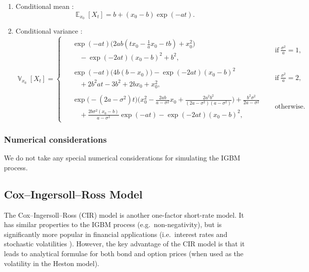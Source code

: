 \documentclass[11pt, letterpaper]{article}
\theoremstyle{definition}
\theoremstyle{remark}
\DeclareMathOperator{\E}{\mathbb{E}}
\DeclareMathOperator{\V}{\mathbb{V}}
\begin{document}
\begin{appendices}
\begin{enumerate}
    \item Conditional mean \cite{tubikanec2022igbm}: \begin{equation}
        \E_{x_0}[X_t] = b + (x_0 - b)\exp(-a t).
    \end{equation}
    \item Conditional variance \cite{tubikanec2022igbm}: \begin{equation}
    \V_{x_0}[X_t] = \begin{cases}
        \begin{aligned}
        &\exp(-at)\bigl( 2 ab (t x_0 -\tfrac{1}{a} x_0 -t b)+x_0^2 \bigr) \\&\quad - \exp(-2at) (x_0 - b)^2 + b^2, 
        \end{aligned}& \quad \text{if} \ \frac{\sigma^2}{a}=1,\\[15pt]
        \begin{aligned}
        &\exp(-at) \bigl(4b (b - x_0) \bigr) - \exp(-2at) (x_0 - b)^2\\&\quad + 2b^2 a t - 3b^2 + 2bx_0 + x_0^2,
        \end{aligned} & \quad \text{if} \ \frac{\sigma^2}{a}=2, \\[15pt]
        \begin{aligned}
        & \exp\bigl(-(2a - \sigma^2)t\bigr) \bigl(x_0^2 - \tfrac{2ab}{a - \sigma^2} x_0 + \tfrac{2a^2b^2}{(2a - \sigma^2)(a - \sigma^2)} \bigr) + \tfrac{b^2 \sigma^2 }{2a - \sigma^2}\\
        &\quad + \tfrac{2b\sigma^2(x_0 - b)}{a-\sigma^2} \exp(-at) - \exp(-2at) (x_0 - b)^2,
         \end{aligned} & \quad  \text{otherwise}.
    \end{cases}
\end{equation}
\end{enumerate}

\subsubsection*{Numerical considerations}
We do not take any special numerical considerations for simulating the IGBM process.

\subsection{Cox--Ingersoll--Ross Model}\label{app:cir}
The Cox--Ingersoll--Ross (CIR) model is another one-factor short-rate model.
It has similar properties to the IGBM process (e.g.~non-negativity), but is significantly more popular in financial applications (i.e.~interest rates \cite{cox1985cir} and stochastic volatilities \cite{heston1993}).
However, the key advantage of the CIR model is that it leads to analytical formulae for both bond and option prices (when used as the volatility in the Heston model).


\end{appendices}
\end{document}
